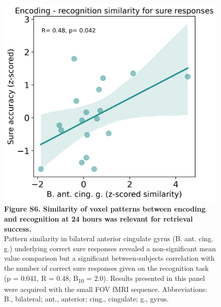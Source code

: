  \begin{figure}[!ht]
    \centering
     \includegraphics[width=0.6\linewidth]{paper/src/figures/20240710_wb-all_memory_n_enc_recog_perm_consc_consc-unconsc_incorr_B. ant. cing. g._ERS_correl.png}
     \caption*{\textbf{Figure S6. Similarity of voxel patterns between encoding and recognition at 24 hours was relevant for retrieval success.} \\ \vspace{0.5em}
 Pattern similarity in bilateral anterior cingulate gyrus (B. ant. cing. g.) underlying correct sure responses revealed a non-significant mean value comparison but a significant between-subjects correlation with the number of correct sure responses given on the recognition task (p = 0.041, R = 0.48, B\textsubscript{10} = 2.0).  Results presented in this panel were acquired with the small FOV fMRI sequence. Abbreviations: B., bilateral; ant., anterior; cing., cingulate; g., gyrus.}
\end{figure}

